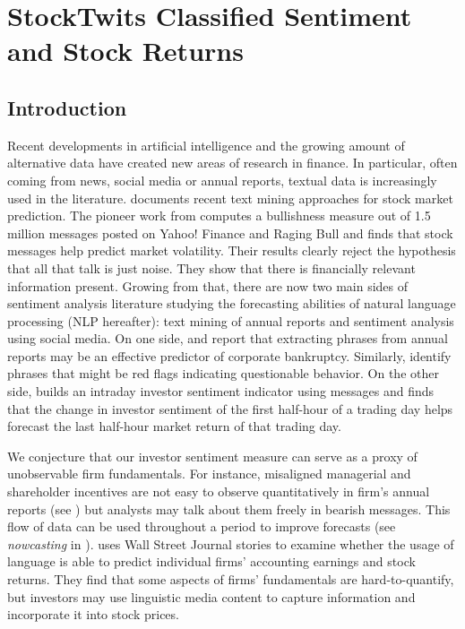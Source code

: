 \chapter{StockTwits Classified Sentiment and Stock Returns}

\section{Introduction}
\label{S:1}

Recent developments in artificial intelligence and the growing amount of alternative data have created new areas of research in finance. In particular, often coming from news, social media or annual reports, textual data is increasingly used in the literature. \citet{nikfarjam2010text} documents recent text mining approaches for stock market prediction. The pioneer work from \citet{antweiler2004all} computes a bullishness measure out of 1.5 million messages posted on Yahoo! Finance and Raging Bull and finds that stock messages help predict market volatility. Their results clearly reject the hypothesis that all that talk is just noise. They show that there is financially relevant information present. Growing from that, there are now two main sides of sentiment analysis literature studying the forecasting abilities of natural language processing (NLP hereafter): text mining of annual reports and sentiment analysis using social media. On one side, \citet{shirata2011extracting} and \citet{cecchini2010making} report that extracting phrases from annual reports may be an effective predictor of corporate bankruptcy. Similarly, \citet{loughran2011barron} identify phrases that might be red flags indicating questionable behavior. On the other side, \citet{renault2017intraday} builds an intraday investor sentiment indicator using messages and finds that the change in investor sentiment of the first half-hour of a trading day helps forecast the last half-hour market return of that trading day.

We conjecture that our investor sentiment measure can serve as a proxy of unobservable firm fundamentals. For instance, misaligned managerial and shareholder incentives are not easy to observe quantitatively in firm's annual reports (see \citet{nikolov2014agency}) but analysts may talk about them freely in bearish messages. This flow of data can be used throughout a period to improve forecasts (see \textit{nowcasting} in \citet{challet2013predicting}). \citet{tetlock2008more} uses Wall Street Journal stories to examine whether the usage of language is able to predict individual firms’ accounting earnings and stock returns. They find that some aspects of firms' fundamentals are hard-to-quantify, but investors may use linguistic media content to capture information and incorporate it into stock prices.

